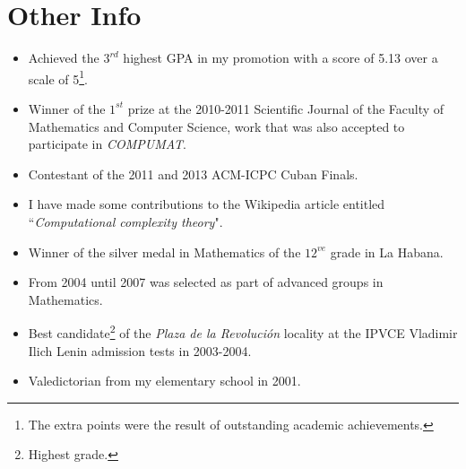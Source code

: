 \documentclass[]{friggeri-cv}
\begin{document}
\section{Other Info}
\begin{itemize}[noitemsep, nolistsep]

	\item Achieved the $3^{rd}$ highest GPA in my promotion with a score of 5.13 over a scale of 5\footnote{The extra points were the result of outstanding academic achievements.}.\\

	\item Winner of the $1^{st}$ prize at the 2010-2011 Scientific Journal of the Faculty of Mathematics and Computer Science, work that was also accepted to participate in \emph{COMPUMAT}.\\

	\item Contestant of the 2011 and 2013 ACM-ICPC Cuban Finals.\\
	
	\item I have made some contributions to the Wikipedia article entitled ``\emph{Computational complexity theory}".\\
		
	\item Winner of the silver medal in Mathematics of the $12^{ve}$ grade in La Habana.\\
	
	\item From 2004 until 2007 was selected as part of advanced groups in Mathematics.\\	
	
	\item Best candidate\footnote{Highest grade.} of the \emph{Plaza de la Revolución} locality at the IPVCE Vladimir Ilich Lenin admission tests in 2003-2004.\\	
	
	\item Valedictorian from my elementary school in 2001.\\	
	
\end{itemize}
\end{document}
